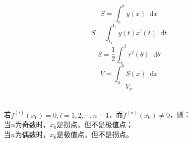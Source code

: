 \documentclass[]{article}
\newcommand*{\dif}{\mathop{}\!\mathrm{d}}
\numberwithin{equation}{section}
\begin{document}
\section{}
\begin{equation}
    S=\int_a^b y(x)\dif x
\end{equation}
\begin{equation}
    S=\int_{t_1}^{t_2}y(t)x^{'}(t)\dif t
\end{equation}
\begin{equation}
    S=\frac{1}{2}\int_\alpha^\beta r^2(\theta)\dif\theta
\end{equation}
\begin{equation}
    V=\int_a^b S(x)\dif x
\end{equation}
\begin{equation}
    V_x
\end{equation}

\section{}
若$f^{(i)}(x_0)=0,i=1,2,\cdots,n-1$，而$f^{(n)}(x_0)\neq0$，则：\\
当$n$为奇数时，$x_0$是拐点，但不是极值点；\\
当$n$为偶数时，$x_0$是极值点，但不是拐点。
\end{document}
